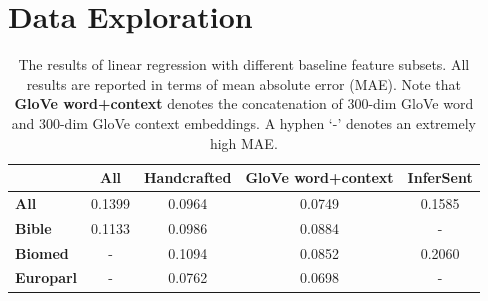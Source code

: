 \documentclass{dcthesis}
\theoremstyle{definition}
\theoremstyle{remark}
\begin{document}
\chapter{Data Exploration}

\begin{table}[]
    \centering
    \begin{tabular}{l|c|c|c|c}
    \toprule
     & \textbf{All} & \textbf{Handcrafted} & \textbf{GloVe word+context} & \textbf{InferSent} \\
    \midrule
    \textbf{All} & 0.1399 & 0.0964 & 0.0749 & 0.1585 \\
    \textbf{Bible} & 0.1133 & 0.0986 & 0.0884 & - \\
    \textbf{Biomed} & - & 0.1094 & 0.0852 & 0.2060 \\
    \textbf{Europarl} & - & 0.0762 & 0.0698 & - \\
    \bottomrule
    \end{tabular}
    \caption{\label{tab:baseline_systems} The results of linear regression with different baseline feature subsets. All results are reported in terms of mean absolute error (MAE). Note that \textbf{GloVe word+context} denotes the concatenation of 300-dim GloVe word and 300-dim GloVe context embeddings. A hyphen `-' denotes an extremely high MAE.}
\end{table}
\end{document}
